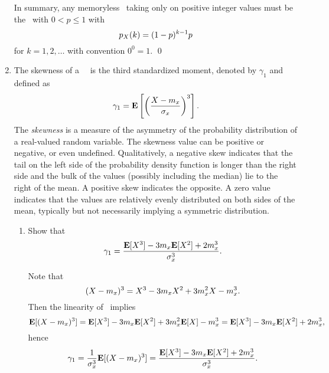 \begin{enumerate}
\begin{solution}
		In summary, any memoryless \randvar\
		taking only on positive integer values
		must be the \geomrv\ with $0< p \leq 1$
		with
		\[
			p_{X}(k) = (1-p)^{k-1} p
		\]
		for $k=1,2,\ldots$ with convention $0^0 = 1$.
		\qed


	\end{solution}
	\fi


	\newcommand{\mux}{\expect{x}}
	\newcommand{\sigx}{\std{x}}
	\item
	The skewness of a \randvar\ \X\ is the third standardized moment,
	denoted by $\gamma_1$ and defined as
	\[
		\gamma_1 = \bExp{\left(\frac{X-\mux}{\sigx}\right)^3}.
	\]
	The \emph{skewness} is a measure of the asymmetry of the probability distribution
	of a real-valued random variable.
	The skewness value can be positive or negative, or even undefined.
	Qualitatively,
	a negative skew indicates that the tail on the left side of the probability density function
	is longer than the right side and the bulk of the values (possibly including the median)
	lie to the right of the mean.
	A positive skew indicates the opposite.
	A zero value indicates that the values are relatively evenly distributed on both sides of the mean, typically but not necessarily implying a symmetric distribution.

	\begin{enumerate}
		\item Show that
		\[
			\gamma_1 = \frac{\Exp{X^3}-3\mux \Exp{X^2} + 2 \mux^3}{\std{x}^3}.
		\]
		\ifdefined\sol
		\begin{solution}
			Note that
			\[
				(X-\mux)^3
				= X^3 - 3\mux X^2 + 3 \mux^2 X - \mux^3.
			\]
			Then the linearity of \Exp{\cdot}\ implies
			\[
				\Exp{(X-\mux)^3}
				= \Exp{X^3} - 3\mux \Exp{X^2} + 3 \mux^2 \Exp{X} - \mux^3
				= \Exp{X^3} - 3\mux \Exp{X^2} + 2 \mux^3,
			\]
			hence
			\[
				\gamma_1 = \frac{1}{\sigx^3} \Exp{(X-\mux)^3}
				= \frac{ \Exp{X^3} - 3\mux \Exp{X^2} + 2 \mux^3 }{\sigx^3}.
			\]

		\end{solution}
		\fi



\end{enumerate}
\end{enumerate}
